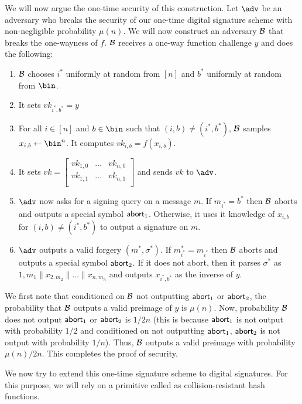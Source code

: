 We will now argue the one-time security of this construction. Let $\adv$ be an adversary who breaks the security of our one-time digital signature scheme with non-negligible probability $\mu(n)$. We will now construct an adversary $\mathcal{B}$ that breaks the one-wayness of $f$. $\mathcal{B}$ receives a one-way function challenge $y$ and does the following:
\begin{enumerate}
    \item $\mathcal{B}$ chooses $i^*$ uniformly at random from $[n]$ and $b^*$ uniformly at random from $\bin$.
    \item It sets $vk_{i^*,b^*} = y$
    \item For all $i \in [n]$ and $b \in \bin$ such that $(i,b) \neq (i^*,b^*)$, $\mathcal{B}$ samples $x_{i,b} \gets \bin^n$. It computes $vk_{i,b} = f(x_{i,b})$.
    \item It sets $vk = \left[ \begin{array}{ccc}
vk_{1,0} & \ldots& vk_{n,0} \\
vk_{1,1} & \ldots& vk_{n,1} \\
\end{array} \right]$ and sends $vk$ to $\adv$.
\item $\adv$ now asks for a signing query on a message $m$. If $m_{i^*} = b^*$ then $\mathcal{B}$ aborts and outputs a special symbol $\mathsf{abort}_1$. Otherwise, it uses it knowledge of $x_{i,b}$ for $(i,b) \neq (i^*,b^*)$ to output a signature on $m$.
\item $\adv$ outputs a valid forgery $(m^*,\sigma^*)$. If $m^*_{i^*} = m_{i^*}$ then $\mathcal{B}$ aborts and outputs a special symbol $\mathsf{abort}_2$. If it does not abort, then it parses $\sigma^*$ as ${1,m_1}\|x_{2,m_2}\| \ldots \| x_{n,m_n}$ and outputs $x_{i^*,b^*}$ as the inverse of $y$.
\end{enumerate}
We first note that conditioned on $\mathcal{B}$ not outputting $\mathsf{abort}_1$ or $\mathsf{abort}_2$, the probability that $\mathcal{B}$ outputs a valid preimage of $y$ is $\mu(n)$. Now, probability $\mathcal{B}$ does not output $\mathsf{abort}_1$ or $\mathsf{abort}_2$ is $1/2n$ (this is because $\mathsf{abort}_1$ is not output with probability $1/2$ and conditioned on not outputting $\mathsf{abort}_1$, $\mathsf{abort}_2$ is not output with probability $1/n$). Thus, $\mathcal{B}$ outputs a valid preimage with probability $\mu(n)/2n$. This completes the proof of security.

We now try to extend this one-time signature scheme to digital signatures. For this purpose, we will rely on a primitive called as collision-resistant hash functions.
